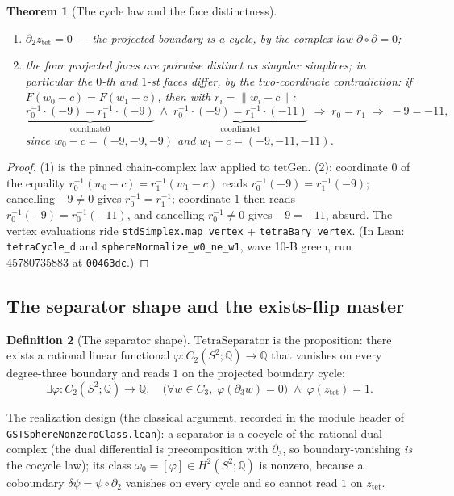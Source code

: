 \documentclass[11pt,a4paper]{article}
\theoremstyle{plain}
\newtheorem{theorem}{Theorem}[section]
\theoremstyle{definition}
\newtheorem{definition}[theorem]{Definition}
\newcommand{\Q}{\mathbb{Q}}
\begin{document}
\begin{theorem}[The cycle law and the face distinctness]
\label{thm:tetra}
\begin{enumerate}
\item $\partial_2 z_{\mathrm{tet}} = 0$ --- the projected boundary is
a cycle, by the complex law $\partial \circ \partial = 0$;
\item the four projected faces are pairwise distinct as singular
simplices; in particular the $0$-th and $1$-st faces differ, by the
two-coordinate contradiction: if
$F(w_0 - c) = F(w_1 - c)$, then with $r_i = \|w_i - c\|$:
\[
\underbrace{r_0^{-1} \cdot (-9) = r_1^{-1} \cdot (-9)}_{\text{coordinate
}0} \;\wedge\;
\underbrace{r_0^{-1} \cdot (-9) = r_1^{-1} \cdot (-11)}_{\text{coordinate
}1}
\;\Longrightarrow\; r_0 = r_1 \;\Longrightarrow\; -9 = -11,
\]
since $w_0 - c = (-9,-9,-9)$ and $w_1 - c = (-9,-11,-11)$.
\end{enumerate}
\end{theorem}

\begin{proof}
(1) is the pinned chain-complex law applied to
$\mathrm{tetGen}$.  (2): coordinate $0$ of the equality
$r_0^{-1}(w_0 - c) = r_1^{-1}(w_1 - c)$ reads $r_0^{-1}(-9) =
r_1^{-1}(-9)$; cancelling $-9 \ne 0$ gives $r_0^{-1} = r_1^{-1}$;
coordinate $1$ then reads $r_0^{-1}(-9) = r_0^{-1}(-11)$, and
cancelling $r_0^{-1} \ne 0$ gives $-9 = -11$, absurd.  The vertex
evaluations ride \texttt{stdSimplex.map\_vertex} +
\texttt{tetraBary\_vertex}.  (In Lean: \texttt{tetraCycle\_d} and
\texttt{sphereNormalize\_w0\_ne\_w1}, wave 10-B green, run
45780735883 at \texttt{00463dc}.)
\end{proof}

\subsection{The separator shape and the exists-flip master}

\begin{definition}[The separator shape]\label{def:separator}
$\mathrm{TetraSeparator}$ is the proposition: there exists a rational
linear functional $\varphi : C_2(S^2;\Q) \to \Q$ that vanishes on
every degree-three boundary and reads $1$ on the projected boundary
cycle:
\[
\exists \varphi : C_2(S^2;\Q) \to \Q, \quad
\bigl( \forall w \in C_3,\; \varphi(\partial_3 w) = 0 \bigr)
\;\wedge\; \varphi(z_{\mathrm{tet}}) = 1 .
\]
\end{definition}

The realization design (the classical argument, recorded in the
module header of \texttt{GSTSphereNonzeroClass.lean}): a separator is
a cocycle of the rational dual complex (the dual differential is
precomposition with $\partial_3$, so boundary-vanishing \emph{is} the
cocycle law); its class $\omega_0 = [\varphi] \in H^2(S^2;\Q)$ is
nonzero, because a coboundary $\delta\psi = \psi \circ \partial_2$
vanishes on every cycle and so cannot read $1$ on
$z_{\mathrm{tet}}$.
\end{document}
